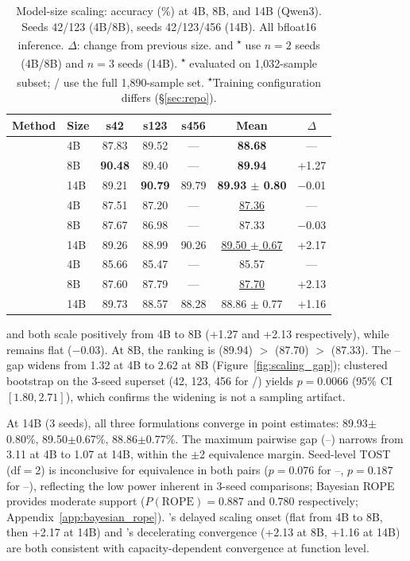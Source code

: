 \begin{table}[t]
\centering
\small
\caption{Model-size scaling: accuracy (\%) at 4B, 8B, and 14B (Qwen3). Seeds 42/123 (4B/8B), seeds 42/123/456 (14B). All bfloat16 inference. $\Delta$: change from previous size. \cwm{} and \traj{}\textsuperscript{$\star$} use $n{=}2$ seeds (4B/8B) and $n{=}3$ seeds (14B). \traj{}\textsuperscript{$\star$} evaluated on 1{,}032-sample subset; \cls{}/\cwm{} use the full 1{,}890-sample set. \textsuperscript{$\star$}Training configuration differs (\S\ref{sec:repo}).}
\label{tab:scaling}
\setlength{\tabcolsep}{3pt}
\begin{tabular}{llccccc}
\toprule
\textbf{Method} & \textbf{Size} & \textbf{s42} & \textbf{s123} & \textbf{s456} & \textbf{Mean} & \textbf{$\Delta$} \\
\midrule
\multirow{3}{*}{\cls{}} & 4B & 87.83 & 89.52 & --- & \textbf{88.68} & --- \\
 & 8B & \textbf{90.48} & 89.40 & --- & \textbf{89.94} & +1.27 \\
 & 14B & 89.21 & \textbf{90.79} & 89.79 & \textbf{89.93 $\pm$ 0.80} & $-$0.01 \\
\midrule
\multirow{3}{*}{\cwm{}} & 4B & 87.51 & 87.20 & --- & \underline{87.36} & --- \\
 & 8B & 87.67 & 86.98 & --- & 87.33 & $-$0.03 \\
 & 14B & 89.26 & 88.99 & 90.26 & \underline{89.50 $\pm$ 0.67} & +2.17 \\
\midrule
\multirow{3}{*}{\traj{}} & 4B & 85.66 & 85.47 & --- & 85.57 & --- \\
 & 8B & 87.60 & 87.79 & --- & \underline{87.70} & +2.13 \\
 & 14B & 89.73 & 88.57 & 88.28 & 88.86 $\pm$ 0.77 & +1.16 \\
\bottomrule
\end{tabular}
\end{table}

\cls{} and \traj{} both scale positively from 4B to 8B (+1.27\pp{} and +2.13\pp{} respectively), while \cwm{} remains flat ($-$0.03\pp{}). At 8B, the ranking is \cls{} (89.94) $>$ \traj{} (87.70) $>$ \cwm{} (87.33). The \cls{}--\cwm{} gap widens from 1.32\pp{} at 4B to 2.62\pp{} at 8B (Figure~\ref{fig:scaling_gap}); clustered bootstrap on the 3-seed superset (42, 123, 456 for \cls{}/\cwm{}) yields $p = 0.0066$ (95\% CI $[1.80, 2.71]$), which confirms the widening is not a sampling artifact.

At 14B (3 seeds), all three formulations converge in point estimates: \cls{} 89.93$\pm$0.80\%, \cwm{} 89.50$\pm$0.67\%, \traj{} 88.86$\pm$0.77\%. The maximum pairwise gap (\cls{}--\traj{}) narrows from 3.11\pp{} at 4B to 1.07\pp{} at 14B, within the $\pm$2\pp{} equivalence margin. Seed-level TOST (df${=}$2) is inconclusive for equivalence in both pairs ($p{=}0.076$ for \cls{}--\cwm{}, $p{=}0.187$ for \cls{}--\traj{}), reflecting the low power inherent in 3-seed comparisons; Bayesian ROPE provides moderate support ($P(\text{ROPE}){=}0.887$ and $0.780$ respectively; Appendix~\ref{app:bayesian_rope}). \cwm{}'s delayed scaling onset (flat from 4B to 8B, then +2.17\pp{} at 14B) and \traj{}'s decelerating convergence (+2.13\pp{} at 8B, +1.16\pp{} at 14B) are both consistent with capacity-dependent convergence at function level.

